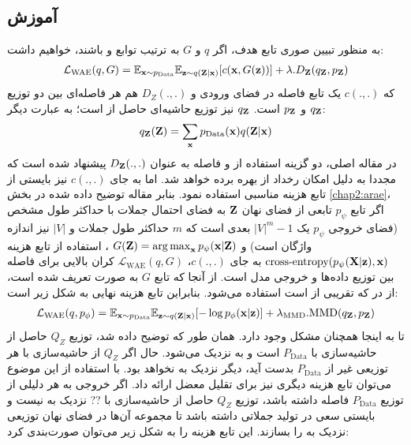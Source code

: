 \subsection{آموزش \wae}
به منظور تبیین صوری تابع هدف، اگر $‎q‎$  و $G$ به ترتیب توابع \encoder{} و \decoder{} باشند، خواهیم داشت:
\begin{gather}
	\mathcal{L}_{\text{WAE}}(q, G) = \mathbb E_{{\bf x} \sim p_{\text{Data}}}\mathbb E_{{\bf z} \sim q({\bf Z}|{\bf x})} [c({\bf x}, G({\bf z}))] + \lambda . D_{\bf Z}(q_{\bf Z}, p_{\bf Z})
\end{gather}
که $c(.,.)$ یک تابع فاصله در فضای ورودی و  $D_Z(. , .)$ هم هر فاصله‌ای بین دو توزیع $q_{\bf Z}$ و $p_{\bf Z}$ است. $q_{\bf Z}$ نیز توزیع حاشیه‌ای حاصل از \encoder{} است؛ به عبارت دیگر:
\begin{gather}
	q_{\bf Z}({\bf Z}) = \sum_{\bf x} p_{\text{Data}}({\bf x}) q({\bf Z}|{\bf x})
\end{gather}
در مقاله اصلی، دو گزینه استفاده از \gan{} و فاصله \mmd{} به عنوان $D_{\bf Z}(.,.)$ پیشنهاد شده است که مجددا به دلیل امکان رخداد \modecollapse{} از \mmd{} بهره برده خواهد شد.
اما به جای $c(.,.)$ نیز بایستی از تابع هزینه مناسبی استفاده نمود. بنابر مقاله توضیح داده شده در بخش \ref{chap2:arae}، اگر تابع $p_\psi$ تابعی از فضای نهان ${\bf Z}$ به فضای احتمال جملات با حداکثر طول مشخص
(فضای خروجی $p_\psi$ یک
$|V|^m-1$
بعدی است که $m$ حداکثر طول جملات و $|V|$ نیز اندازه واژگان است) و
$G({\bf Z}) = \operatorname*{arg\,max}_{{\bf x}} p_\psi({\bf x}|{\bf Z})$
، استفاده از تابع هزینه
$\text{cross-entropy}(p_\psi({\bf X}|{\bf z}), {\bf x})$
به جای $c(.,.)$،
$\mathcal{L}_{\text{WAE}}(q, G)$
کران بالایی برای فاصله \wasser{} بین توزیع داده‌ها و خروجی مدل است. از آنجا که تابع $G$ به صورت \argmaxphrase{} تعریف شده است، از \greedydecoding{} در \decoder{} که تقریبی از \argmaxphrase{} است استفاده می‌شود.
بنابراین تابع هزینه نهایی به شکل زیر است:
\begin{gather}
	\mathcal{L}_{\text{WAE}}(q, p_\phi) = \mathbb E_{{\bf x} \sim p_{\text{Data}}}\mathbb E_{{\bf z} \sim q({\bf Z}|{\bf x})} [-\log p_\phi({\bf x}|{\bf z})] + \lambda_\text{MMD} . \text{MMD}(q_{\bf Z}, p_{\bf Z})
\end{gather}
\iffalse
تا به اینجا همچنان مشکل \expbias{} وجود دارد. همان طور که توضیح داده شد، توزیع $Q_Z$ حاصل از حاشیه‌سازی با $P_\text{Data}$ است و به \priordist{} نزدیک می‌شود. حال اگر $Q_Z$ از حاشیه‌سازی  با هر توزیعی غیر از $P_\text{Data}$ بدست آید، دیگر نزدیک به \priordist{} نخواهد بود. با استفاده از این موضوع می‌توان تابع هزینه دیگری نیز برای تقلیل معضل \expbias{} ارائه داد. اگر خروجی \decoder{} به هر دلیلی از توزیع $P_\text{Data}$ فاصله داشته باشد، توزیع $Q_Z$ حاصل از حاشیه‌سازی با ?? نزدیک به \priordist{} نیست و \decoder{} بایستی سعی در تولید جملاتی داشته باشد تا مجموعه آن‌ها در فضای نهان توزیعی نزدیک به \priordist{} را بسازند. این تابع هزینه را به شکل زیر می‌توان صورت‌بندی کرد:
